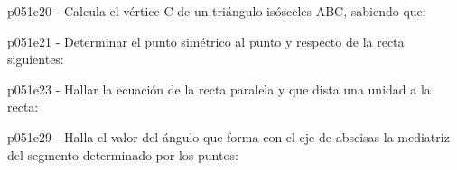 \documentclass[spanish, 11pt]{exam}
\begin{document}
\begin{questions}
\begin{multicols}{2}
\begin{parts}
        \end{parts}
        \end{multicols}
        \question p051e20 - Calcula el vértice C de un triángulo isósceles ABC, sabiendo que:
        \begin{multicols}{1} 
        \end{multicols}
        \question p051e21 - Determinar el punto simétrico al punto y respecto de la recta siguientes:
        \begin{multicols}{1} 
        \end{multicols}
        \question p051e23 - Hallar la ecuación de la recta paralela y que dista una unidad a la recta:
        \begin{multicols}{1} 
        \end{multicols}
        \question p051e29 - Halla el valor del ángulo que forma con el eje de abscisas la mediatriz del segmento determinado por los puntos:
        \begin{multicols}{1} 
\end{multicols}
\end{questions}
\end{document}

